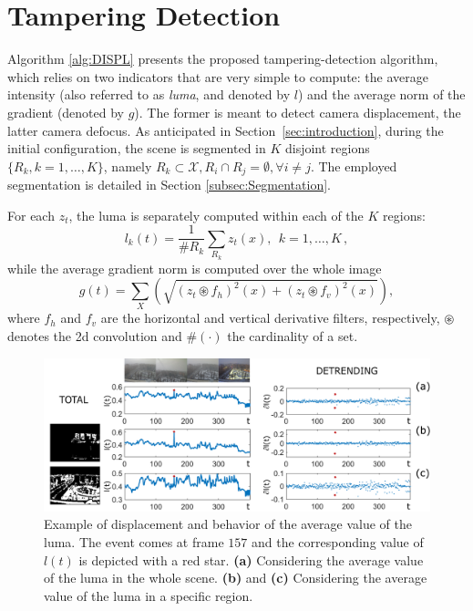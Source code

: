 \documentclass{llncs}
\begin{document}
\section{Tampering Detection}\label{sec:propSol}

Algorithm \ref{alg:DISPL} presents the proposed tampering-detection algorithm, which relies on two indicators that are very simple to compute: the average intensity (also referred to as \emph{luma}, and denoted by $l$) and the average norm of the gradient (denoted by $g$). The former is meant to detect camera displacement, the latter camera defocus. As anticipated in Section~\ref{sec:introduction}, during the initial configuration, the scene is segmented in $K$ disjoint regions $\{R_k, k = 1,\dots,K\}$, namely $R_k \subset \mathcal{X}, R_i \cap R_j = \emptyset, \forall i \neq j$. The employed segmentation is detailed in Section \ref{subsec:Segmentation}. 



For each $z_t$, the luma is separately computed within each of the $K$ regions:
\begin{equation}\label{eq:lumaRegions}
l_k(t) =\frac{1}{\#R_k} \sum_{R_k} z_t(x), \ \ k = 1, \dots, K\,,
\end{equation}
while the average gradient norm is computed over the whole image
\begin{equation}
\label{eq:normaGradiente}
g(t) = \sum_X \left (\sqrt{\left(z_t \circledast f_h\right)^2(x) + \left(z_t \circledast f_v\right)^2(x)}\right),
\end{equation}
where $f_h$ and $f_v$ are the horizontal and vertical derivative filters, respectively, $\circledast$ denotes the 2d convolution and $\#(\cdot)$ the cardinality of a set.

\begin{figure}[tb]
\centering
\includegraphics[width=1\linewidth]{Immagini/indicatori}
\caption{Example of displacement and behavior of the average value of the luma. The event comes at frame $157$ and the corresponding value of $l(t)$ is depicted with a red star. \textbf{(a)} Considering the average value of the luma in the whole scene. \textbf{(b)} and \textbf{(c)} Considering the average value of the luma in a specific region.}
\label{fig:indicatori} 
\end{figure}
\end{document}
